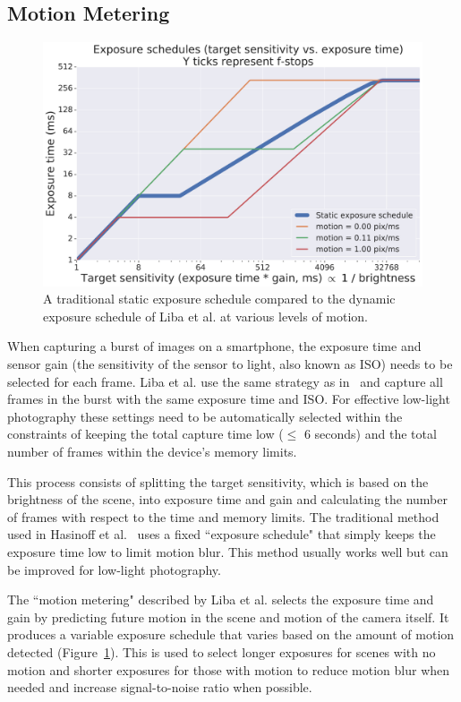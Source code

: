 \documentclass{sig-alternate}
\begin{document}
\subsection{Motion Metering}
\label{sec:motionMetering}

\begin{figure}
\centering
\includegraphics[width=\columnwidth]{figures/liba2019-figure-7.pdf}
\caption{A traditional static exposure schedule compared to the dynamic exposure schedule of Liba et al. at various levels of motion.~\cite{Liba2019}}
\label{fig:exposure}

\end{figure}

When capturing a burst of images on a smartphone, the exposure time and sensor gain (the sensitivity of the sensor to light, also known as ISO) needs to be selected for each frame. Liba et al. use the same strategy as in~\cite{Hasinoff2016} and capture all frames in the burst with the same exposure time and ISO. For effective low-light photography these settings need to be automatically selected within the constraints of keeping the total capture time low ($\leq$ 6 seconds) and the total number of frames within the device's memory limits.

This process consists of splitting the target sensitivity, which is based on the brightness of the scene, into exposure time and gain and calculating the number of frames with respect to the time and memory limits. The traditional method used in Hasinoff et al.~\cite{Hasinoff2016} uses a fixed ``exposure schedule" that simply keeps the exposure time low to limit motion blur. This method usually works well but can be improved for low-light photography.

The ``motion metering" described by Liba et al. selects the exposure time and gain by predicting future motion in the scene and motion of the camera itself. It produces a variable exposure schedule that varies based on the amount of motion detected (Figure~\ref{fig:exposure}). This is used to select longer exposures for scenes with no motion and shorter exposures for those with motion to reduce motion blur when needed and increase signal-to-noise ratio when possible.
\end{document}
